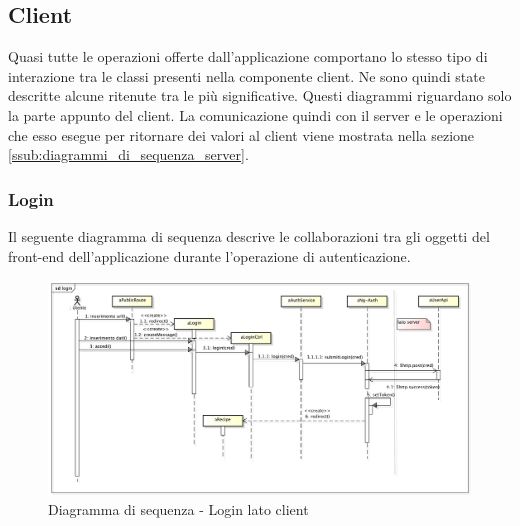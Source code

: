 %


\subsection{Client} %
\label{ssub:diagrammi_di_sequenza_client}
Quasi tutte le operazioni offerte dall'applicazione comportano lo stesso tipo di interazione tra le classi presenti nella componente client. Ne sono quindi state descritte alcune ritenute tra le più significative. \newline
Questi diagrammi riguardano solo la parte appunto del client. La comunicazione quindi con il server e le operazioni che esso esegue per ritornare dei valori al client viene mostrata nella sezione \ref{ssub:diagrammi_di_sequenza_server}.

	\subsubsection{Login} %
	\label{ssub:login}
	Il seguente diagramma di sequenza descrive le collaborazioni tra gli oggetti del front-end dell'applicazione durante l'operazione di autenticazione. \newline


\begin{figure}[htbp]
	\centering
	\centerline{\includegraphics[scale=0.45]{./images/sequence_diagram/client_login.pdf}}
	\caption{Diagramma di sequenza - Login lato client}
\end{figure}



